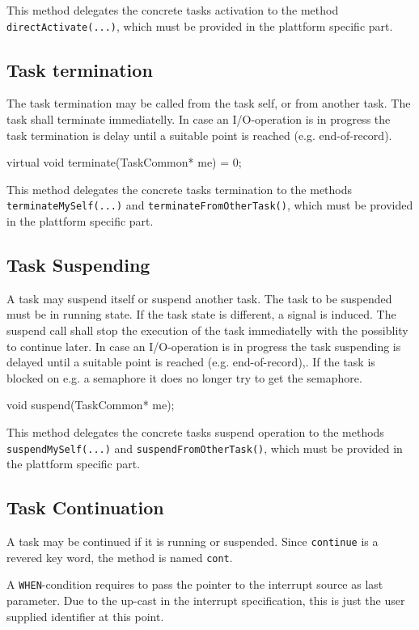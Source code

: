 This method delegates the concrete tasks activation to the method
\verb|directActivate(...)|, which must be provided in the plattform specific
part.

\subsection{Task termination}
The task termination may be called from the task self, or from another task.
The task shall terminate immediatelly. In case an I/O-operation is in progress
the task termination is delay until a suitable point is reached
(e.g. end-of-record).

\begin{CppCode}
virtual void terminate(TaskCommon* me) = 0;
\end{CppCode}

This method delegates the concrete tasks termination to the methods
\verb|terminateMySelf(...)| and \verb|terminateFromOtherTask()|,
which must be provided in the plattform specific part.

\subsection{Task Suspending}
A task may suspend itself or suspend another task.
The task to be suspended must be in running state. If the task state
is different, a signal is induced.
The suspend call shall 
stop the execution of the task immediatelly with the possiblity to 
continue later.
In case an I/O-operation is in progress the task suspending is delayed
until a suitable point is reached (e.g. end-of-record),. 
If the task is blocked on e.g. a semaphore it does no longer try to get 
the semaphore.
 
\begin{CppCode}
void suspend(TaskCommon* me);
\end{CppCode}

This method delegates the concrete tasks suspend operation to the methods
\verb|suspendMySelf(...)| and \verb|suspendFromOtherTask()|,
which must be provided in the plattform specific part.

\subsection{Task Continuation}
A task may be continued if it is running or suspended.
Since \verb|continue| is a revered key word, the method is named \verb|cont|.

A \verb|WHEN|-condition requires to pass the pointer to the interrupt source
as last parameter. Due to the up-cast in the interrupt specification, this
is just the user supplied identifier at this point.

